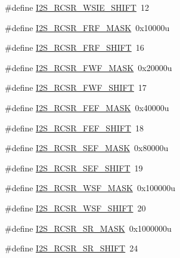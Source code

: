 \begin{DoxyCompactItemize}
\item 
\#define \hyperlink{group___i2_s___register___masks_ga8098ed540d0c07df3e2b016fe65a9e5c}{I2\+S\+\_\+\+R\+C\+S\+R\+\_\+\+W\+S\+I\+E\+\_\+\+S\+H\+I\+FT}~12
\item 
\#define \hyperlink{group___i2_s___register___masks_ga0d74ae3611f2cf19e24ccbe0dc8954e1}{I2\+S\+\_\+\+R\+C\+S\+R\+\_\+\+F\+R\+F\+\_\+\+M\+A\+SK}~0x10000u
\item 
\#define \hyperlink{group___i2_s___register___masks_ga6ba9ef68184846438336caac1a9b545d}{I2\+S\+\_\+\+R\+C\+S\+R\+\_\+\+F\+R\+F\+\_\+\+S\+H\+I\+FT}~16
\item 
\#define \hyperlink{group___i2_s___register___masks_gaf00407ae9539455c97266c28c4ca1b14}{I2\+S\+\_\+\+R\+C\+S\+R\+\_\+\+F\+W\+F\+\_\+\+M\+A\+SK}~0x20000u
\item 
\#define \hyperlink{group___i2_s___register___masks_gaf6b1db4fbb777b2fea1370fc4739f6fe}{I2\+S\+\_\+\+R\+C\+S\+R\+\_\+\+F\+W\+F\+\_\+\+S\+H\+I\+FT}~17
\item 
\#define \hyperlink{group___i2_s___register___masks_gae19cc8504d7958933dc2ad606612672f}{I2\+S\+\_\+\+R\+C\+S\+R\+\_\+\+F\+E\+F\+\_\+\+M\+A\+SK}~0x40000u
\item 
\#define \hyperlink{group___i2_s___register___masks_ga0ca8c449f2ef79ebd2f5f5c7ece147bf}{I2\+S\+\_\+\+R\+C\+S\+R\+\_\+\+F\+E\+F\+\_\+\+S\+H\+I\+FT}~18
\item 
\#define \hyperlink{group___i2_s___register___masks_gaf3c11fda39cb358eee170388ab7b7417}{I2\+S\+\_\+\+R\+C\+S\+R\+\_\+\+S\+E\+F\+\_\+\+M\+A\+SK}~0x80000u
\item 
\#define \hyperlink{group___i2_s___register___masks_ga70011d51385aea06b36d00242d4a65b0}{I2\+S\+\_\+\+R\+C\+S\+R\+\_\+\+S\+E\+F\+\_\+\+S\+H\+I\+FT}~19
\item 
\#define \hyperlink{group___i2_s___register___masks_gaa14ba358b2ee10ed6187cd42ce5f8283}{I2\+S\+\_\+\+R\+C\+S\+R\+\_\+\+W\+S\+F\+\_\+\+M\+A\+SK}~0x100000u
\item 
\#define \hyperlink{group___i2_s___register___masks_gabff061f9865f4a60d0d64f65ee778428}{I2\+S\+\_\+\+R\+C\+S\+R\+\_\+\+W\+S\+F\+\_\+\+S\+H\+I\+FT}~20
\item 
\#define \hyperlink{group___i2_s___register___masks_gaee1b2649bf3f1ed282bdc66bf270c2b8}{I2\+S\+\_\+\+R\+C\+S\+R\+\_\+\+S\+R\+\_\+\+M\+A\+SK}~0x1000000u
\item 
\#define \hyperlink{group___i2_s___register___masks_ga8e35d0667c6e8c5aa9ce6acb88bbfaf1}{I2\+S\+\_\+\+R\+C\+S\+R\+\_\+\+S\+R\+\_\+\+S\+H\+I\+FT}~24
\item 

\end{DoxyCompactItemize}

